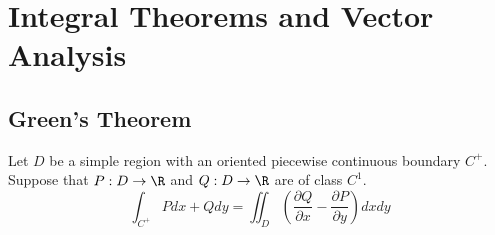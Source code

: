 \section{Integral Theorems and Vector Analysis}
\subsection{Green's Theorem}

\begin{thm}
	Let $D$ be a simple region with an oriented piecewise continuous boundary $C^+$. Suppose that $P: D \rightarrow \R$ and $Q: D \rightarrow \R$ are of class $C^1$.
	\[\int_{C^{+}} P d x+Q d y=\iint_D\left(\frac{\partial Q}{\partial x}-\frac{\partial P}{\partial y}\right) d x d y\]
\end{thm}


